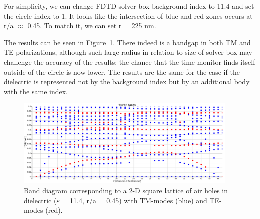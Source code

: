\documentclass[11pt,a4paper]{article}
\begin{document}
For simplicity, we can change FDTD solver box background index to 11.4 and set the circle index to 1. It looks like the intersection of blue and red zones occurs at r/a $\approx$ 0.45. To match it, we can set r = 225 nm. 

The results can be seen in Figure~\ref{fig:q5}. There indeed is a bandgap in both TM and TE polarizations, although such large radius in relation to size of solver box may challenge the accuracy of the results: the chance that the time monitor finds itself outside of the circle is now lower. The results are the same for the case if the dielectric is represented not by the background index but by an additional body with the same index. 

\begin{figure}[ht]
   \centering
    \includegraphics[width=0.95\textwidth]{q5.png}
    \caption{Band diagram corresponding to a 2-D square lattice of air holes in dielectric ($\varepsilon$ = 11.4, r/a = 0.45) with TM-modes (blue) and TE-modes (red).}
    \label{fig:q5}
\end{figure}
\end{document}
